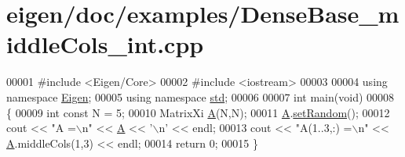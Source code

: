 \hypertarget{eigen_2doc_2examples_2_dense_base__middle_cols__int_8cpp_source}{}\section{eigen/doc/examples/\+Dense\+Base\+\_\+middle\+Cols\+\_\+int.cpp}
\label{eigen_2doc_2examples_2_dense_base__middle_cols__int_8cpp_source}

\begin{DoxyCode}
00001 \textcolor{preprocessor}{#include <Eigen/Core>}
00002 \textcolor{preprocessor}{#include <iostream>}
00003 
00004 \textcolor{keyword}{using namespace }\hyperlink{namespace_eigen}{Eigen};
00005 \textcolor{keyword}{using namespace }\hyperlink{namespacestd}{std};
00006 
00007 \textcolor{keywordtype}{int} main(\textcolor{keywordtype}{void})
00008 \{
00009     \textcolor{keywordtype}{int} \textcolor{keyword}{const} N = 5;
00010     MatrixXi \hyperlink{group___core___module_class_eigen_1_1_matrix}{A}(N,N);
00011     \hyperlink{group___core___module_class_eigen_1_1_matrix}{A}.\hyperlink{class_eigen_1_1_plain_object_base_af0e576a0e1aefc9ee346de44cc352ba3}{setRandom}();
00012     cout << \textcolor{stringliteral}{"A =\(\backslash\)n"} << \hyperlink{group___core___module_class_eigen_1_1_matrix}{A} << \textcolor{charliteral}{'\(\backslash\)n'} << endl;
00013     cout << \textcolor{stringliteral}{"A(1..3,:) =\(\backslash\)n"} << \hyperlink{group___core___module_class_eigen_1_1_matrix}{A}.middleCols(1,3) << endl;
00014     \textcolor{keywordflow}{return} 0;
00015 \}
\end{DoxyCode}

